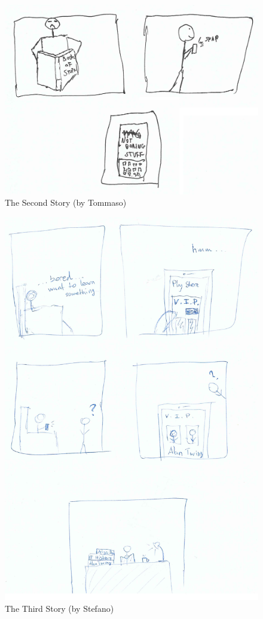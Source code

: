 \documentclass[12pt]{scrartcl}
\begin{document}
	\begin{figure}[H]
        		\centering
       		\includegraphics[width=\textwidth]{../images/story2.jpg}
       		\caption{The Second Story (by Tommaso)}
        		\label{story2}
	\end{figure}
	
	\begin{figure}[H]
        		\centering
       		\includegraphics[width=\textwidth]{../images/story3.jpg}
       		\caption{The Third Story (by Stefano)}
        		\label{story3}
	\end{figure}
	
\end{document}
